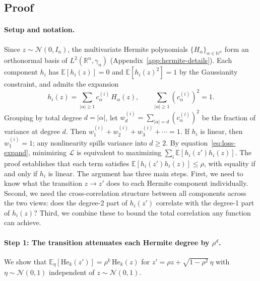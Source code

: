 \subsection{Proof}


\paragraph{Setup and notation.}
Since $z \sim \mathcal{N}(0, I_n)$, the multivariate Hermite polynomials $\{H_\alpha\}_{\alpha \in \mathbb{N}^n}$ form an orthonormal basis of $L^2(\mathbb{R}^n, \gamma_n)$ (Appendix~\ref{app:hermite-details}).
Each component $h_i$ has $\mathbb{E}[h_i(z)] = 0$ and $\mathbb{E}[h_i(z)^2] = 1$ by the Gaussianity constraint, and admits the expansion
\begin{equation}\label{eq:app-hermite-expand-pf}
    h_i(z) = \sum_{|\alpha| \geq 1} c_\alpha^{(i)}\, H_\alpha(z), \qquad \sum_{|\alpha| \geq 1} (c_\alpha^{(i)})^2 = 1.
\end{equation}
Grouping by total degree $d = |\alpha|$, let $w_d^{(i)} = \sum_{|\alpha|=d} (c_\alpha^{(i)})^2$ be the fraction of variance at degree $d$.
Then $w_1^{(i)} + w_2^{(i)} + w_3^{(i)} + \cdots = 1$.
If $h_i$ is linear, then $w_1^{(i)} = 1$; any nonlinearity spills variance into $d \geq 2$.
By equation~\eqref{eq:loss-expand}, minimizing $\mathcal{L}$ is equivalent to maximizing $\sum_i \mathbb{E}[h_i(z') h_i(z)]$.
The proof establishes that each term satisfies $\mathbb{E}[h_i(z') h_i(z)] \leq \rho$, with equality if and only if $h_i$ is linear.
The argument has three main steps.
First, we need to know what the transition $z \to z'$ does to each Hermite component individually.
Second, we need the cross-correlation structure between all components across the two views: does the degree-2 part of $h_i(z')$ correlate with the degree-1 part of $h_i(z)$?
Third, we combine these to bound the total correlation any function can achieve.


\paragraph{Step 1: The transition attenuates each Hermite degree by $\rho^d$.}
We show that $\mathbb{E}_\eta[\mathrm{He}_k(z')] = \rho^k\,\mathrm{He}_k(z)$ for $z' = \rho z + \sqrt{1-\rho^2}\,\eta$ with $\eta \sim \mathcal{N}(0,1)$ independent of $z \sim \mathcal{N}(0,1)$.

